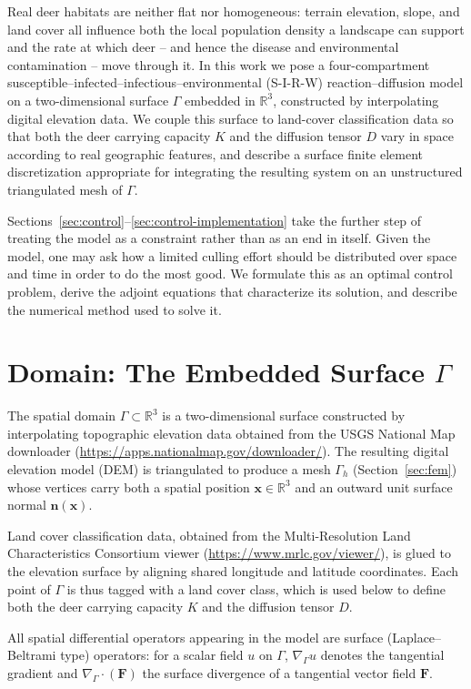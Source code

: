 \documentclass[11pt]{article}
\newcommand{\Grad}{\nabla_\Gamma}
\newcommand{\Div}{\nabla_\Gamma\cdot}
\begin{document}
Real deer habitats are neither flat nor homogeneous: terrain elevation, slope, and land cover all influence both the local population density a landscape can support and the rate at which deer -- and hence the disease and environmental contamination -- move through it. In this work we pose a four-compartment susceptible--infected--infectious--environmental (S-I-R-W) reaction--diffusion model on a two-dimensional surface $\Gamma$ embedded in $\mathbb{R}^3$, constructed by interpolating digital elevation data. We couple this surface to land-cover classification data so that both the deer carrying capacity $K$ and the diffusion tensor $D$ vary in space according to real geographic features, and describe a surface finite element discretization appropriate for integrating the resulting system on an unstructured triangulated mesh of $\Gamma$.

Sections~\ref{sec:control}--\ref{sec:control-implementation} take the further step of treating the model as a constraint rather than as an end in itself. Given the model, one may ask how a limited culling effort should be distributed over space and time in order to do the most good. We formulate this as an optimal control problem, derive the adjoint equations that characterize its solution, and describe the numerical method used to solve it.

\section{Domain: The Embedded Surface $\Gamma$}
\label{sec:domain}

The spatial domain $\Gamma \subset \mathbb{R}^3$ is a two-dimensional surface constructed by interpolating topographic elevation data obtained from the USGS National Map downloader (\url{https://apps.nationalmap.gov/downloader/}). The resulting digital elevation model (DEM) is triangulated to produce a mesh $\Gamma_h$ (Section~\ref{sec:fem}) whose vertices carry both a spatial position $\mathbf{x} \in \mathbb{R}^3$ and an outward unit surface normal $\mathbf{n}(\mathbf{x})$.

Land cover classification data, obtained from the Multi-Resolution Land Characteristics Consortium viewer (\url{https://www.mrlc.gov/viewer/}), is glued to the elevation surface by aligning shared longitude and latitude coordinates. Each point of $\Gamma$ is thus tagged with a land cover class, which is used below to define both the deer carrying capacity $K$ and the diffusion tensor $D$.

All spatial differential operators appearing in the model are surface (Laplace--Beltrami type) operators: for a scalar field $u$ on $\Gamma$, $\Grad u$ denotes the tangential gradient and $\Div(\mathbf{F})$ the surface divergence of a tangential vector field $\mathbf{F}$.
\end{document}
